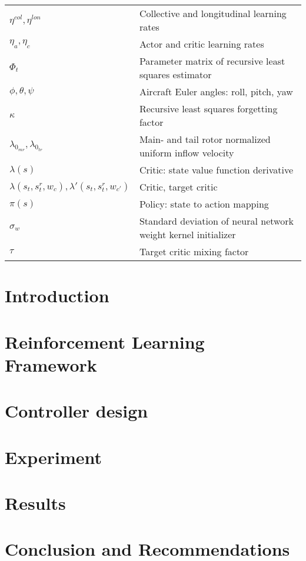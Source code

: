 \documentclass[conf]{new-aiaa} %
\begin{document}
{\begin{longtable*}{@{}l @{\quad=\quad} l@{}}
$\eta^{col}, \eta^{lon}$ & Collective and longitudinal learning rates \\
$\eta_a, \eta_c$    & Actor and critic learning rates \\
$\Phi_t$            & Parameter matrix of recursive least squares estimator \\
$\phi, \theta, \psi$ & Aircraft Euler angles: roll, pitch, yaw \\
$\kappa$            & Recursive least squares forgetting factor \\
$\lambda_{0_{mr}}, \lambda_{0_{tr}}$ & Main- and tail rotor normalized uniform inflow velocity \\
$\lambda(s) $       & Critic: state value function derivative \\
$\lambda(s_t, s_t^r, w_c), \lambda'(s_t, s_t^r, w_{c'})$ & Critic, target critic \\
$\pi(s)$            & Policy: state to action mapping \\
$\sigma_w$          & Standard deviation of neural network weight kernel initializer \\
$\tau$              & Target critic mixing factor \\
\end{longtable*}}


\newpage

\section{Introduction} \label{sec:introduction}

\section{Reinforcement Learning Framework} \label{sec:framework}
 
\section{Controller design} \label{sec:controller}
 
\section{Experiment} \label{sec:experiment}

\section{Results}\label{sec:results}
 
\section{Conclusion and Recommendations}\label{sec:conclusions}
 

\FloatBarrier

\end{document}
